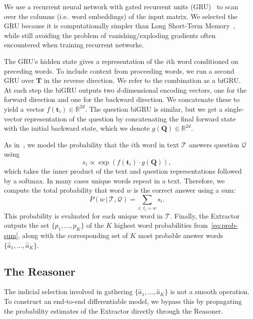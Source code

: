 \documentclass[11pt,letterpaper]{article}
\begin{document}
We use a recurrent neural network with gated recurrent units (GRU)~\cite{bahdanau2014} to scan over the columns (i.e.~word embeddings) of the input matrix.
We selected the GRU because it is computationally simpler than Long Short-Term Memory~\cite{hochreiter1997}, while still avoiding the problem of vanishing/exploding gradients often encountered when training recurrent networks.

The GRU's hidden state gives a representation of the $i$th word conditioned on preceding words. To include context from proceeding words, we run a second GRU over $\mathbf{T}$ in the reverse direction. We refer to the combination as a biGRU. At each step the biGRU outputs two $d$-dimensional encoding vectors, one for the forward direction and one for the backward direction. We concatenate these to yield a vector $f(\mathbf{t}_i) \in \mathbb{R}^{2d}$. The question biGRU is similar, but we get a single-vector representation of the question by concatenating the final forward state with the initial backward state, which we denote $g(\mathbf{Q}) \in \mathbb{R}^{2d}$.

As in~, we model the probability that the $i$th word in text $\mathcal{T}$ answers question $\mathcal{Q}$ using
\begin{equation}
	s_i \propto \exp(f(\mathbf{t}_i) \cdot g(\mathbf{Q})),
	\label{eq:k-prob}
\end{equation}
which takes the inner product of the text and question representations followed by a softmax. In many cases unique words repeat in a text. Therefore, we compute the total probability that word $w$ is the correct answer using a sum:
\begin{equation}
	P(w \, | \, \mathcal{T}, \mathcal{Q}) = \sum_{i:~t_i=w} s_i.
	\label{eq:prob-sum}
\end{equation}
This probability is evaluated for each unique word in $\mathcal{T}$. Finally, the Extractor outputs the set $\{p_1, ..., p_K\}$ of the $K$ highest word probabilities from~\ref{eq:prob-sum}, along with the corresponding set of $K$ most probable answer words $\{\hat{a}_1, ..., \hat{a}_K \}$.

\subsection{The Reasoner}
\label{sec:reasoner}
The indicial selection involved in gathering $\{\hat{a}_1, ..., \hat{a}_K \}$ is not a smooth operation. To construct an end-to-end differentiable model, we bypass this by propagating the probability estimates of the Extractor directly through the Reasoner.
\end{document}
